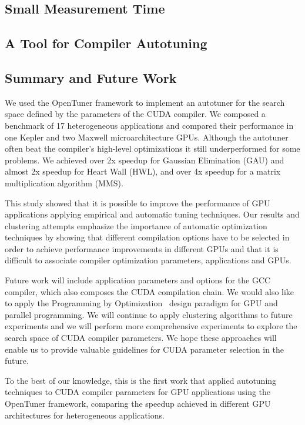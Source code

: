 \subsection{Small Measurement Time}
\label{subsec:smalltime}

\subsection{A Tool for Compiler Autotuning}

\subsection{Summary and Future Work}
\label{subsec:GPUconcl}

We used the OpenTuner framework to implement an autotuner for the search space
defined by the parameters of the CUDA compiler. We composed a benchmark of 17
heterogeneous applications and compared their performance in one Kepler and two
Maxwell microarchitecture GPUs.  Although the autotuner often beat the
compiler’s high-level optimizations it still underperformed for some problems.
We achieved over 2x speedup for Gaussian Elimination (GAU) and almost 2x
speedup for Heart Wall (HWL),  and over 4x speedup for a matrix multiplication
algorithm (MMS).

This study showed that it is possible to improve the performance of GPU
applications applying empirical and automatic tuning techniques. Our results
and clustering attempts emphasize the importance of automatic optimization
techniques by showing that different compilation options have to be selected in
order to achieve performance improvements in different GPUs and that it is
difficult to associate compiler optimization parameters, applications and GPUs.

Future work will include application parameters and options for the GCC
compiler, which also composes the CUDA compilation chain.  We would also like
to apply the Programming by Optimization~\cite{hoos2012programming} design
paradigm for GPU and parallel programming. We will continue to apply clustering
algorithms to future experiments and we will perform more comprehensive
experiments to explore the search space of CUDA compiler parameters. We hope
these approaches will enable us to provide valuable guidelines for CUDA
parameter selection in the future.

To the best of our knowledge, this is the first work that applied autotuning
techniques to CUDA compiler parameters for GPU applications using the OpenTuner
framework, comparing the speedup achieved in different GPU architectures for
heterogeneous applications.
